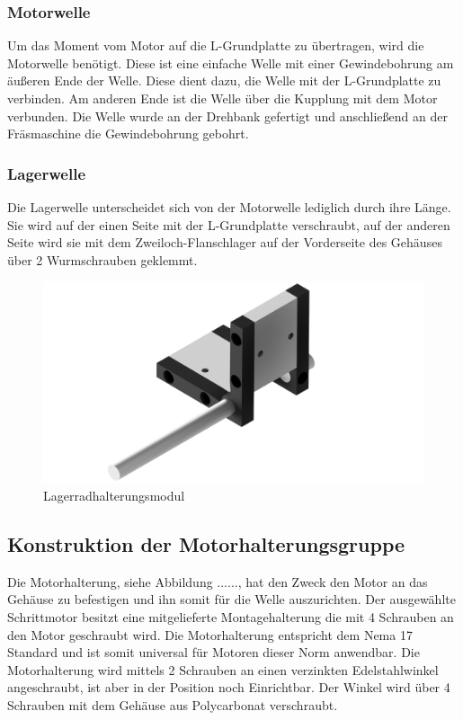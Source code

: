 \subsubsection{Motorwelle}
Um das Moment vom Motor auf die L-Grundplatte zu übertragen, wird die Motorwelle benötigt. Diese ist eine einfache Welle
mit einer Gewindebohrung am äußeren Ende der Welle. Diese dient dazu, die Welle mit der L-Grundplatte zu verbinden.
Am anderen Ende ist die Welle über die Kupplung mit dem Motor verbunden.
Die Welle wurde an der Drehbank gefertigt und anschließend an der Fräsmaschine die Gewindebohrung gebohrt.

\subsubsection{Lagerwelle}
Die Lagerwelle unterscheidet sich von der Motorwelle lediglich durch ihre Länge. Sie wird auf der einen Seite mit der
L-Grundplatte verschraubt, auf der anderen Seite wird sie mit dem Zweiloch-Flanschlager auf der Vorderseite des Gehäuses über
2 Wurmschrauben geklemmt.

\begin{figure}
    \centering
    \includegraphics[scale=0.25,page=1]{fig/mech/LagerRadGruppekomplett}
    \caption{Lagerradhalterungsmodul}
\end{figure}

\subsection{Konstruktion der Motorhalterungsgruppe}

Die Motorhalterung, siehe Abbildung ......, hat den Zweck den Motor an das Gehäuse zu befestigen und ihn somit für die Welle auszurichten. Der ausgewählte Schrittmotor
besitzt eine mitgelieferte Montagehalterung die mit 4 Schrauben an den Motor geschraubt wird. Die Motorhalterung entspricht dem Nema 17
Standard und ist somit universal für Motoren dieser Norm anwendbar. Die Motorhalterung wird mittels 2 Schrauben an einen verzinkten Edelstahlwinkel angeschraubt, ist aber
in der Position noch Einrichtbar. Der Winkel wird über 4 Schrauben mit dem Gehäuse aus Polycarbonat verschraubt.

